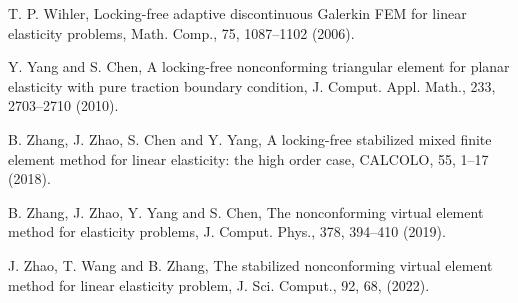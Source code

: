 \documentclass[11pt]{article}
\numberwithin{equation}{section}
\begin{document}
\begin{thebibliography}{99.}
 T. P. Wihler, Locking-free adaptive discontinuous Galerkin FEM for linear elasticity problems, Math. Comp.,  75, 1087--1102 (2006).

 Y. Yang and  S. Chen, A locking-free nonconforming triangular element for planar elasticity with pure traction boundary condition, J. Comput. Appl. Math., 233, 2703--2710 (2010).


 B. Zhang, J. Zhao, S. Chen and  Y. Yang, A locking-free stabilized mixed finite element method for linear elasticity: the high order case, CALCOLO, 55, 1--17 (2018).

 B. Zhang, J. Zhao, Y. Yang and  S. Chen, The nonconforming virtual element method for elasticity problems, J. Comput. Phys., 378, 394--410 (2019).

 J. Zhao, T. Wang and  B. Zhang, The stabilized nonconforming virtual element method for linear elasticity problem, J. Sci. Comput., 92, 68, (2022).

\end{thebibliography}
\end{document}

